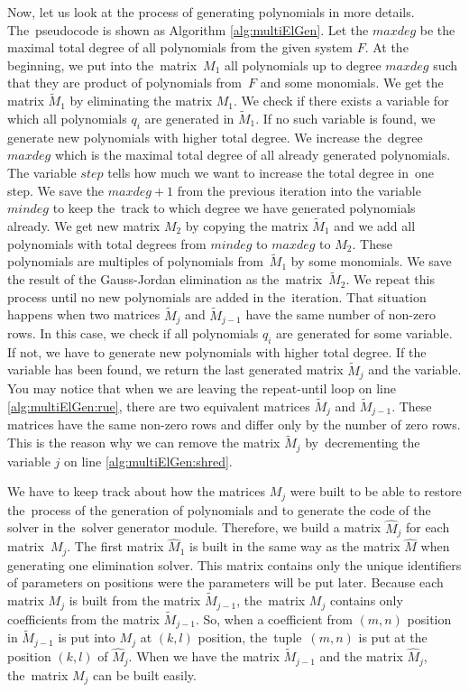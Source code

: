 Now, let us look at the process of generating polynomials in more details. The~pseudocode is shown as Algorithm \ref{alg:multiElGen}. Let the $maxdeg$ be the maximal total degree of all polynomials from the given system $F$. At the beginning, we put into the~matrix~$M_1$ all polynomials up to degree $maxdeg$ such that they are product of polynomials from~$F$ and some monomials. We get the matrix $\tilde{M}_1$ by eliminating the matrix $M_1$. We check if there exists a variable for which all polynomials $q_i$ are generated in $\tilde{M}_1$. If no such variable is found, we generate new polynomials with higher total degree. We increase the~degree $maxdeg$ which is the maximal total degree of all already generated polynomials. The variable $step$ tells how much we want to increase the total degree in~one step. We save the $maxdeg + 1$ from the previous iteration into the variable $mindeg$ to keep the~track to which degree we have generated polynomials already. We get new matrix $M_2$ by copying the matrix $\tilde{M}_1$ and we add all polynomials with total degrees from $mindeg$ to $maxdeg$ to $M_2$. These polynomials are multiples of polynomials from~$\tilde{M}_1$ by some monomials. We save the result of the Gauss-Jordan elimination as the~matrix~$\tilde{M}_2$. We repeat this process until no new polynomials are added in the~iteration. That situation happens when two matrices $\tilde{M}_j$ and $\tilde{M}_{j-1}$ have the same number of non-zero rows. In this case, we check if all polynomials $q_i$ are generated for some variable. If not, we have to generate new polynomials with higher total degree. If the variable has been found, we return the last generated matrix $\tilde{M}_j$ and the variable. You may notice that when we are leaving the repeat-until loop on line \ref{alg:multiElGen:rue}, there are two equivalent matrices $\tilde{M}_j$ and $\tilde{M}_{j-1}$. These matrices have the same non-zero rows and differ only by the number of zero rows. This is the reason why we can remove the matrix $\tilde{M}_j$ by~decrementing the variable $j$ on line \ref{alg:multiElGen:shred}.



We have to keep track about how the matrices $M_j$ were built to be able to restore the~process of the generation of polynomials and to generate the code of the solver in the~solver generator module. Therefore, we build a matrix $\hat{M}_j$ for each matrix~$M_j$. The first matrix $\hat{M}_1$ is built in the same way as the matrix $\hat{M}$ when generating one elimination solver. This matrix contains only the unique identifiers of parameters on positions were the parameters will be put later. Because each matrix $M_j$ is built from the matrix $\tilde{M}_{j-1}$, the~matrix $M_j$ contains only coefficients from the matrix $\tilde{M}_{j-1}$. So, when a coefficient from $(m,n)$ position in $\tilde{M}_{j-1}$ is put into $M_j$ at $(k, l)$ position, the~tuple~$(m, n)$ is put at the position $(k, l)$ of $\hat{M}_j$. When we have the matrix $\tilde{M}_{j-1}$ and the matrix $\hat{M}_j$, the~matrix $M_j$ can be built easily.

